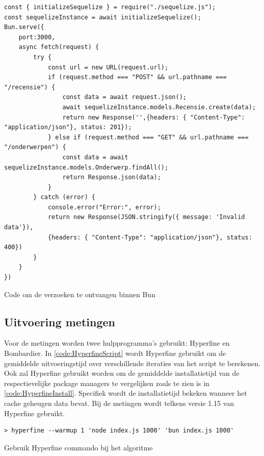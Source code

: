 \begin{listing}[H]
  \centering
  \begin{verbatim}
const { initializeSequelize } = require("./sequelize.js");
const sequelizeInstance = await initializeSequelize();
Bun.serve({
    port:3000,
    async fetch(request) {
        try {
            const url = new URL(request.url);
            if (request.method === "POST" && url.pathname === "/recensie") {
                const data = await request.json();
                await sequelizeInstance.models.Recensie.create(data);
                return new Response('',{headers: { "Content-Type": "application/json"}, status: 201});
            } else if (request.method === "GET" && url.pathname === "/onderwerpen") {
                const data = await sequelizeInstance.models.Onderwerp.findAll();
                return Response.json(data);
            }
        } catch (error) {
            console.error("Error:", error);
            return new Response(JSON.stringify({ message: 'Invalid data'}), 
            {headers: { "Content-Type": "application/json"}, status: 400})
        }
    }
})
\end{verbatim}
\caption[Ontvangen van verzoeken in Bun]{\label{code:BunServer}Code om de verzoeken te ontvangen binnen Bun}
\end{listing}
\subsection{Uitvoering metingen}
Voor de metingen worden twee hulpprogramma's gebruikt: Hyperfine en Bombardier.
In \ref{code:HyperfineScript} wordt Hyperfine gebruikt om de gemiddelde uitvoeringstijd over verschillende iteraties van het script te berekenen.
Ook zal Hyperfine gebruikt worden om de gemiddelde installatietijd van de respectievelijke package managers te vergelijken zoals 
te zien is in \ref{code:HyperfineInstall}. Specifiek wordt de installatietijd bekeken wanneer het cache geheugen data bevat.
Bij de metingen wordt telkens versie 1.15 van Hyperfine gebruikt.
\begin{listing}[H]
  \centering
  \begin{verbatim}
> hyperfine --warmup 1 'node index.js 1000' 'bun index.js 1000'
      \end{verbatim}
      \caption[Gebruik Hyperfine bij het algoritme]{\label{code:HyperfineScript}Gebruik Hyperfine commando bij het algoritme}
\end{listing}


